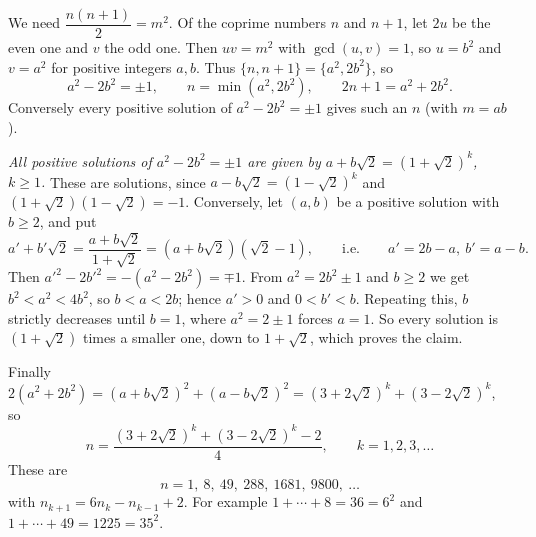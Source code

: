 We need $\dfrac{n(n+1)}{2}=m^2$. Of the coprime numbers $n$ and $n+1$, let $2u$ be the even one and $v$ the odd one. Then $uv=m^2$ with $\gcd(u,v)=1$, so $u=b^2$ and $v=a^2$ for positive integers $a,b$. Thus $\{n,n+1\}=\{a^2,2b^2\}$, so
\[a^2-2b^2=\pm1,\qquad n=\min\left(a^2,2b^2\right),\qquad 2n+1=a^2+2b^2.\]
Conversely every positive solution of $a^2-2b^2=\pm1$ gives such an $n$ (with $m=ab$).

\emph{All positive solutions of $a^2-2b^2=\pm1$ are given by $a+b\sqrt2=\left(1+\sqrt2\right)^k$, $k\ge1$.} These are solutions, since $a-b\sqrt2=\left(1-\sqrt2\right)^k$ and $\left(1+\sqrt2\right)\left(1-\sqrt2\right)=-1$. Conversely, let $(a,b)$ be a positive solution with $b\ge2$, and put
\[a'+b'\sqrt2=\dfrac{a+b\sqrt2}{1+\sqrt2}=\left(a+b\sqrt2\right)\left(\sqrt2-1\right),\qquad\text{i.e.}\qquad a'=2b-a,\ b'=a-b.\]
Then $a'^2-2b'^2=-\left(a^2-2b^2\right)=\mp1$. From $a^2=2b^2\pm1$ and $b\ge2$ we get $b^2<a^2<4b^2$, so $b<a<2b$; hence $a'>0$ and $0<b'<b$. Repeating this, $b$ strictly decreases until $b=1$, where $a^2=2\pm1$ forces $a=1$. So every solution is $\left(1+\sqrt2\right)$ times a smaller one, down to $1+\sqrt2$, which proves the claim.

Finally $2\left(a^2+2b^2\right)=\left(a+b\sqrt2\right)^2+\left(a-b\sqrt2\right)^2=\left(3+2\sqrt2\right)^k+\left(3-2\sqrt2\right)^k$, so
\[n=\dfrac{\left(3+2\sqrt2\right)^k+\left(3-2\sqrt2\right)^k-2}{4},\qquad k=1,2,3,\dots\]
These are
\[\boxed{n=1,\ 8,\ 49,\ 288,\ 1681,\ 9800,\ \dots}\]
with $n_{k+1}=6n_k-n_{k-1}+2$. For example $1+\cdots+8=36=6^2$ and $1+\cdots+49=1225=35^2$.
